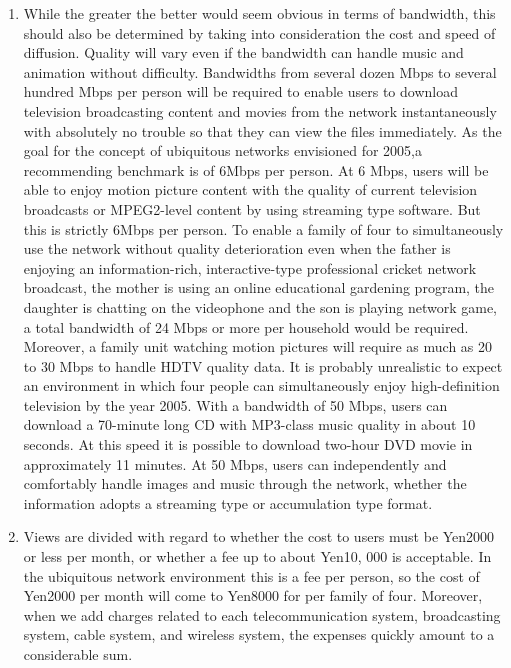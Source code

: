 \documentclass[12pt]{report}
\begin{document}
\begin{enumerate}
\item While the greater the better would seem obvious in terms of bandwidth, this should also be determined by taking into consideration the cost and speed of diffusion. Quality will vary even if the bandwidth can handle music and animation without difficulty. Bandwidths from several dozen Mbps to several hundred Mbps per person will be required to enable users to download television broadcasting content and movies from the network instantaneously with absolutely no trouble so that they can view the files immediately. As the goal for the concept of ubiquitous networks envisioned for 2005,a recommending benchmark is of 6Mbps per person. At 6 Mbps, users will be able to enjoy motion picture content with the quality of current television broadcasts or MPEG2-level content by using streaming type software. But this is strictly 6Mbps per person. To enable a family of four to simultaneously use the network without quality deterioration even when the father is enjoying an information-rich, interactive-type professional cricket network broadcast, the mother is using an online educational gardening program, the daughter is chatting on the videophone and the son is playing network game, a total bandwidth of 24 Mbps or more per household would be required. Moreover, a family unit watching motion pictures will require as much as 20 to 30 Mbps to handle HDTV quality data. It is probably unrealistic to expect an environment in which four people can simultaneously enjoy high-definition television by the year 2005. With a bandwidth of 50 Mbps, users can download a 70-minute long CD with MP3-class music quality in about 10 seconds. At this speed it is possible to download two-hour DVD movie in approximately 11 minutes. At 50 Mbps, users can independently and comfortably handle images and music through the network, whether the information adopts a streaming type or accumulation type format.
\item Views are divided with regard to whether the cost to users must be Yen2000 or less per month, or whether a fee up to about Yen10, 000 is acceptable. In the ubiquitous network environment this is a fee per person, so the cost of Yen2000 per month will come to Yen8000 for per family of four. Moreover, when we add charges related to each telecommunication system, broadcasting system, cable system, and wireless system, the expenses quickly amount to a considerable sum.\\
\end{enumerate}\\
\end{document}
